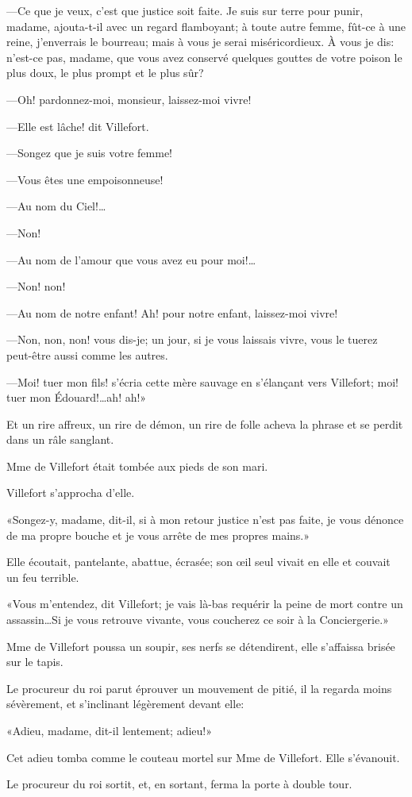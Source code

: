 —Ce que je veux, c'est que justice soit faite. Je suis sur terre pour punir, madame, ajouta-t-il avec un regard flamboyant; à toute autre femme, fût-ce à une reine, j'enverrais le bourreau; mais à vous je serai miséricordieux. À vous je dis: n'est-ce pas, madame, que vous avez conservé quelques gouttes de votre poison le plus doux, le plus prompt et le plus sûr? 

—Oh! pardonnez-moi, monsieur, laissez-moi vivre! 

—Elle est lâche! dit Villefort. 

—Songez que je suis votre femme! 

—Vous êtes une empoisonneuse! 

—Au nom du Ciel!\dots 

—Non! 

—Au nom de l'amour que vous avez eu pour moi!\dots 

—Non! non! 

—Au nom de notre enfant! Ah! pour notre enfant, laissez-moi vivre! 

—Non, non, non! vous dis-je; un jour, si je vous laissais vivre, vous le tuerez peut-être aussi comme les autres. 

—Moi! tuer mon fils! s'écria cette mère sauvage en s'élançant vers Villefort; moi! tuer mon Édouard!\dots ah! ah!» 

Et un rire affreux, un rire de démon, un rire de folle acheva la phrase et se perdit dans un râle sanglant. 

Mme de Villefort était tombée aux pieds de son mari. 

Villefort s'approcha d'elle. 

«Songez-y, madame, dit-il, si à mon retour justice n'est pas faite, je vous dénonce de ma propre bouche et je vous arrête de mes propres mains.» 

Elle écoutait, pantelante, abattue, écrasée; son œil seul vivait en elle et couvait un feu terrible. 

«Vous m'entendez, dit Villefort; je vais là-bas requérir la peine de mort contre un assassin\dots Si je vous retrouve vivante, vous coucherez ce soir à la Conciergerie.» 

Mme de Villefort poussa un soupir, ses nerfs se détendirent, elle s'affaissa brisée sur le tapis. 

Le procureur du roi parut éprouver un mouvement de pitié, il la regarda moins sévèrement, et s'inclinant légèrement devant elle: 

«Adieu, madame, dit-il lentement; adieu!» 

Cet adieu tomba comme le couteau mortel sur Mme de Villefort. Elle s'évanouit. 

Le procureur du roi sortit, et, en sortant, ferma la porte à double tour. 